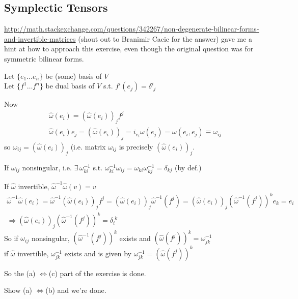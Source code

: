 
\subsection{Symplectic Tensors}


{\scriptsize{\url{http://math.stackexchange.com/questions/342267/non-degenerate-bilinear-forms-and-invertible-matrices}}} (shout out to Branimir Cacic for the answer)  gave me a hint at how to approach this exercise, even though the original question was for symmetric bilinear forms.  

Let $\lbrace e_1 \dots e_n \rbrace$ be (some) basis of $V$ \\
Let $\lbrace f^1 \dots f^n \rbrace$ be dual basis of $V$ s.t. $f^i(e_j)=\delta^i_{ \,\, j}$

Now
\[
\begin{aligned}
  & \widehat{\omega}(e_i) = (\widehat{\omega}(e_i))_jf^j \\
  & \widehat{\omega}(e_i)e_j = (\widehat{\omega}(e_i))_j = i_{e_i}\omega(e_j) = \omega(e_i,e_j) \equiv \omega_{ij}
\end{aligned}
\]
so $\omega_{ij} = (\widehat{\omega}(e_i))_j$ (i.e. matrix $\omega_{ij}$ is precisely $(\widehat{\omega}(e_i))_j$.  

If $\omega_{ij}$ nonsingular, i.e. $\exists \, \omega^{-1}_{ki}$ s.t. $\omega^{-1}_{ki} \omega_{ij} = \omega_{ki}\omega^{-1}_{kj} = \delta_{kj}$ (by def.)

If $\widehat{\omega}$ invertible, $\widehat{\omega}^{-1} \widehat{\omega}(v) = v$
\[
\begin{gathered}
  \widehat{\omega}^{-1}\widehat{\omega}(e_i) = \widehat{\omega}^{-1}(\widehat{\omega}(e_i))_j f^j = (\widehat{\omega}(e_i))_j \widehat{\omega}^{-1}(f^j) = (\widehat{\omega}(e_i))_j(\widehat{\omega}^{-1}(f^j))^k e_k = e_i \\
\Longrightarrow (\widehat{\omega}(e_i))_j(\widehat{\omega}^{-1}(f^j))^k = \delta_i^{ \, \, k}
\end{gathered}
\]
So if $\omega_{ij}$ nonsingular, $(\widehat{\omega}^{-1}(f^j))^k$ exists and $(\widehat{\omega}(f^j))^k = \omega^{-1}_{jk}$ \\
\phantom{So } if $\widehat{\omega}$ invertible, $\omega^{-1}_{jk}$ exists and is given by $\omega^{-1}_{jk} = (\widehat{\omega}(f^j))^k$


So the (a) $\Longleftrightarrow$(c) part of the exercise is done.  

Show (a) $\Longleftrightarrow$(b) and we're done.

